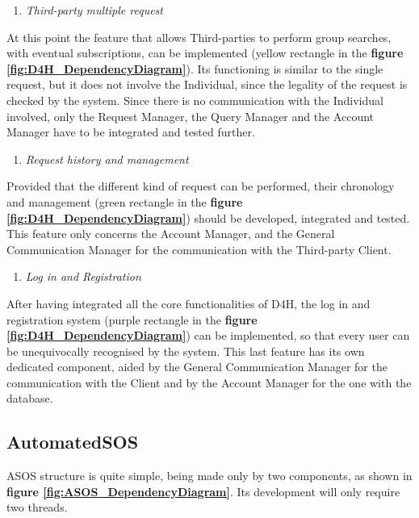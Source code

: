     \begin{enumerate} [resume]
        \item \emph{Third-party multiple request}
    \end{enumerate}
    At this point the feature that allows Third-parties to perform group searches, with eventual subscriptions, can be implemented (yellow rectangle in the \textbf{figure \ref{fig:D4H_DependencyDiagram}}). Its functioning is similar to the single request, but it does not involve the Individual, since the legality of the request is checked by the system. Since there is no communication with the Individual involved, only the Request Manager, the Query Manager and the Account Manager have to be integrated and tested further. \\
    
    \begin{enumerate} [resume]
        \item \emph{Request history and management}
    \end{enumerate}
    Provided that the different kind of request can be performed, their chronology and management (green rectangle in the \textbf{figure \ref{fig:D4H_DependencyDiagram}}) should be developed, integrated and tested. This feature only concerns the Account Manager, and the General Communication Manager for the communication with the Third-party Client.
    
    \begin{enumerate} [resume]
        \item \emph{Log in and Registration}
    \end{enumerate}
    After having integrated all the core functionalities of D4H, the log in and registration system (purple rectangle in the \textbf{figure \ref{fig:D4H_DependencyDiagram}}) can be implemented, so that every user can be unequivocally recognised by the system. This last feature has its own dedicated component, aided by the General Communication Manager for the communication with the Client and by the Account Manager for the one with the database.

\subsection{AutomatedSOS}
    ASOS structure is quite simple, being made only by two components, as shown in \textbf{figure \ref{fig:ASOS_DependencyDiagram}}. Its development will only require two threads.
    
